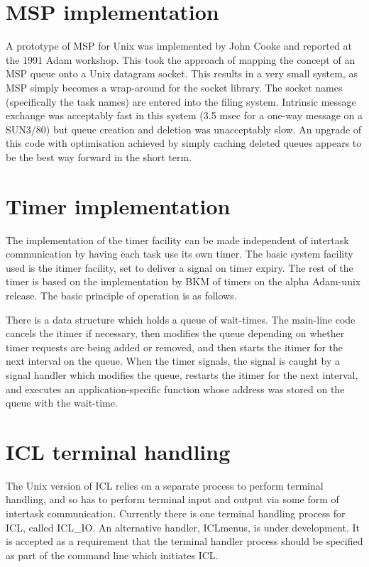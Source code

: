 \section {MSP implementation}

A prototype of MSP for Unix was implemented by John Cooke and reported
at the 1991 Adam workshop. This took the approach of mapping the concept
of an MSP queue onto a Unix datagram socket. This results in a very
small system, as MSP simply becomes a wrap-around for the socket
library. The socket names (specifically the task names) are entered into
the filing system. Intrinsic message exchange was acceptably fast in
this system (3.5 msec for a one-way message on a SUN3/80) but queue
creation and deletion was unacceptably slow. An upgrade of this code
with optimisation achieved by simply caching deleted queues appears to
be the best way forward in the short term.


\section {Timer implementation}

The implementation of the timer facility can be made independent of
intertask communication by having each task use its own timer. The basic
system facility used is the itimer facility, set to deliver a signal on
timer expiry. The rest of the timer is based on the implementation by
BKM of timers on the alpha Adam-unix release. The basic principle of
operation is as follows.

There is a data structure which holds a queue of wait-times. The
main-line code cancels the itimer if necessary, then modifies the queue
depending on whether timer requests are being added or removed, and then
starts the itimer for the next interval on the queue. When the timer
signals, the signal is caught by a signal handler which modifies the
queue, restarts the itimer for the next interval, and executes an
application-specific function whose address was stored on the queue with
the wait-time.


\section {ICL terminal handling}

The Unix version of ICL relies on a separate process to perform terminal
handling, and so has to perform terminal input and output via some form
of intertask communication. Currently there is one terminal handling
process for ICL, called ICL\_IO. An alternative handler, ICLmenus, is
under development. It is accepted as a requirement that the terminal
handler process should be specified as part of the command line which
initiates ICL.

